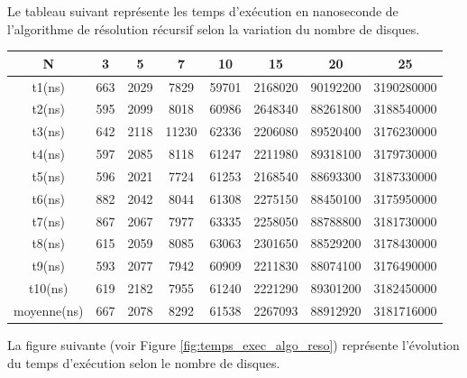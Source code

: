 Le tableau suivant représente les temps d'exécution en nanoseconde de l'algorithme de résolution récursif selon la variation du nombre de disques.\\
\small
\begin{center}
    \begin{tabular}{| c | c | c | c | c | c | c | c |}
        \hline
        N & 3 & 5 & 7 & 10 & 15 & 20 & 25\\
        \hline
        t1(ns) & 663 & 2029 & 7829 & 59701 & 2168020 & 90192200 & 3190280000\\
        \hline
        t2(ns) & 595 & 2099 & 8018 & 60986 & 2648340 & 88261800 & 3188540000\\
        \hline
        t3(ns) & 642 & 2118 & 11230 & 62336 & 2206080 & 89520400 & 3176230000\\
        \hline
        t4(ns) & 597 & 2085 & 8118 & 61247 & 2211980 & 89318100 & 3179730000\\
        \hline
        t5(ns) & 596 & 2021 & 7724 & 61253 & 2168540 & 88693300 & 3187330000\\
        \hline
        t6(ns) & 882 & 2042 & 8044 & 61308 & 2275150 & 88450100 & 3175950000\\
        \hline
        t7(ns) & 867 & 2067 & 7977 & 63335 & 2258050 & 88788800 & 3181730000\\
        \hline
        t8(ns) & 615 & 2059 & 8085 & 63063 & 2301650 & 88529200 & 3178430000\\
        \hline
        t9(ns) & 593 & 2077 & 7942 & 60909 & 2211830 & 88074100 & 3176490000\\
        \hline
        t10(ns) & 619 & 2182 & 7955 & 61240 & 2221290 & 89301200 & 3182450000\\
        \hline
        moyenne(ns) & 667 & 2078 & 8292 & 61538 & 2267093 & 88912920 & 3181716000\\
        \hline
    \end{tabular}
\end{center}
\normalsize

\par
La figure suivante (voir Figure \ref{fig:temps_exec_algo_reso}) représente l'évolution du temps d'exécution selon le nombre de disques.

